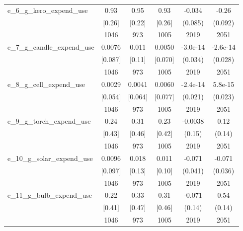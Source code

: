 \begin{table}[htbp]
\begin{tabular*}{0.9\hsize}{@{\hskip\tabcolsep\extracolsep\fill}l*{1}{ccccc}}
e\_6\_g\_kero\_expend\_use           &     0.93&     0.95&     0.93&   -0.034         &    -0.26\sym{***}\\
                                &   [0.26]&   [0.22]&   [0.26]&  (0.085)         &  (0.092)         \\
                                &     1046&      973&     1005&     2019         &     2051         \\
e\_7\_g\_candle\_expend\_use         &   0.0076&    0.011&   0.0050& -3.0e-14         & -2.6e-14         \\
                                &  [0.087]&   [0.11]&  [0.070]&  (0.034)         &  (0.028)         \\
                                &     1046&      973&     1005&     2019         &     2051         \\
e\_8\_g\_cell\_expend\_use           &   0.0029&   0.0041&   0.0060& -2.4e-14         &  5.8e-15         \\
                                &  [0.054]&  [0.064]&  [0.077]&  (0.021)         &  (0.023)         \\
                                &     1046&      973&     1005&     2019         &     2051         \\
e\_9\_g\_torch\_expend\_use          &     0.24&     0.31&     0.23&  -0.0038         &     0.12         \\
                                &   [0.43]&   [0.46]&   [0.42]&   (0.15)         &   (0.14)         \\
                                &     1046&      973&     1005&     2019         &     2051         \\
e\_10\_g\_solar\_expend\_use         &   0.0096&    0.018&    0.011&   -0.071\sym{*}  &   -0.071\sym{**} \\
                                &  [0.097]&   [0.13]&   [0.10]&  (0.041)         &  (0.036)         \\
                                &     1046&      973&     1005&     2019         &     2051         \\
e\_11\_g\_bulb\_expend\_use          &     0.22&     0.33&     0.31&   -0.071         &     0.54\sym{***}\\
                                &   [0.41]&   [0.47]&   [0.46]&   (0.14)         &   (0.14)         \\
                                &     1046&      973&     1005&     2019         &     2051         \\

\end{tabular*}
\end{table}
